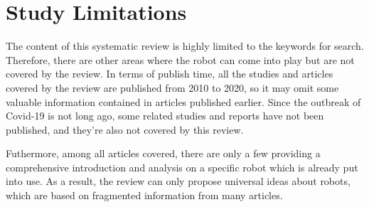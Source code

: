 \documentclass[a4paper]{article}
\begin{document}
\section{Study Limitations}
The content of this systematic review is highly limited to the keywords for search. Therefore, there are other areas where the robot can come into play but are not covered by the review. In terms of publish time, all the studies and articles covered by the review are published from 2010 to 2020, so it may omit some valuable information contained in articles published earlier. Since the outbreak of Covid-19 is not long ago, some related studies and reports have not been published, and they're also not covered by this review. 
\par Futhermore, among all articles covered, there are only a few providing a comprehensive introduction and analysis on a specific robot which is already put into use. As a result, the review can only propose universal ideas about robots, which are based on fragmented information from many articles.
\end{document}
